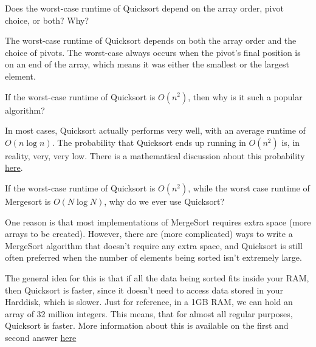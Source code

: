 \begin{blocksection}
\question Does the worst-case runtime of Quicksort depend on the array order,
pivot choice, or both? Why?

\begin{solution}[1in]
The worst-case runtime of Quicksort depends on both the array order and the
choice of pivots. The worst-case always occurs when the pivot's final position
is on an end of the array, which means it was either the smallest or the
largest element.
\end{solution}
\end{blocksection}

\begin{blocksection}
\question If the worst-case runtime of Quicksort is $O(n^2)$, then why is it
such a popular algorithm? 

\begin{solution}[1in]
In most cases, Quicksort actually performs very well, with an average runtime of 
$O(n \log n)$. The probability that Quicksort ends up running in $O(n^2)$ is, in reality,
very, very low. There is a mathematical discussion about this probability \href{https://www.khanacademy.org/computing/computer-science/algorithms/quick-sort/a/analysis-of-quicksort}{here}.
\end{solution}
\end{blocksection}

\begin{blocksection}
\question If the worst-case runtime of Quicksort is $O(n^2)$, while the worst case
runtime of Mergesort is $O(N \log N)$, why do we ever use Quicksort?

\begin{solution}[1in]
One reason is that most implementations of MergeSort requires extra space (more arrays to be created). However, there are (more complicated) ways to write a MergeSort algorithm that doesn't require any extra space, and Quicksort is still often preferred when the number of elements being sorted isn't extremely large. 

The general idea for this is that if all the data being sorted fits inside your RAM, then Quicksort is faster, since it doesn't need to access data stored in your Harddisk, which is slower. Just for reference, in a 1GB RAM, we can hold an array of 32 million integers. This means, that for almost all regular purposes, Quicksort is faster. More information about this is available on the first and second answer \href{https://stackoverflow.com/questions/70402/why-is-quicksort-better-than-mergesort}{here}
\end{solution}
\end{blocksection}
